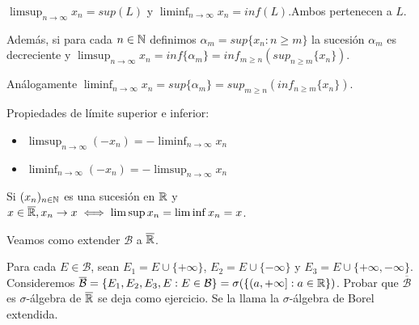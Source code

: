 \begin{definition}
    $\limsup_{n \to \infty} x_n = sup(L)$ y $\liminf_{n \to \infty} x_n = inf(L)$.Ambos pertenecen a $L$.
    
    Además, si para cada $n \in \mathbb{N}$ definimos $\alpha_m = sup\{ x_n : n \geq m \}$ la sucesión $\alpha_m$ es decreciente y 
    $\limsup_{n \to \infty} x_n = inf\{\alpha_m\} = inf_{m \geq n} ( sup_{n \geq m}\{x_n\} )$.

    Análogamente $\liminf_{n \to \infty} x_n = sup\{\alpha_m\} = sup_{m \geq n} ( inf_{n \geq m}\{x_n\} )$. 
\end{definition}

\begin{prop}
    Propiedades de límite superior e inferior:
    \begin{itemize}
        \item $\limsup_{n \to \infty} (- x_n) = - \liminf_{n \to \infty} x_n$
        \item $\liminf_{n \to \infty} (- x_n) = - \limsup_{n \to \infty} x_n$
    \end{itemize}
\end{prop}

\begin{note}
    Si $(x_n)_{n \in \mathbb{N}}$ es una sucesión en $\mathbb{R}$ y $x \in \overline{\mathbb{R}}, x_n \to x \iff \limsup x_n = \liminf x_n = x$.
\end{note}

Veamos como extender $\mathcal{B}$ a $\overline{\mathbb{R}}$.

\begin{definition}
    Para cada $E \in \mathcal{B}$, sean $E_1 = E \cup \{ + \infty \}$, $E_2 = E \cup \{ - \infty \}$ y $E_3 = E \cup \{ + \infty, - \infty \}$.
    Consideremos $\overline{\mathcal{B}} = \{ E_1, E_2, E_3, E : E \in \mathcal{B} \} = \sigma(\{ (a, +\infty] : a \in \mathbb{R} \})$.
    Probar que $\overline{\mathcal{B}}$ es $\sigma$-álgebra de $\overline{\mathbb{R}}$ se deja como ejercicio. Se la llama la $\sigma$-álgebra de Borel extendida.
\end{definition}

